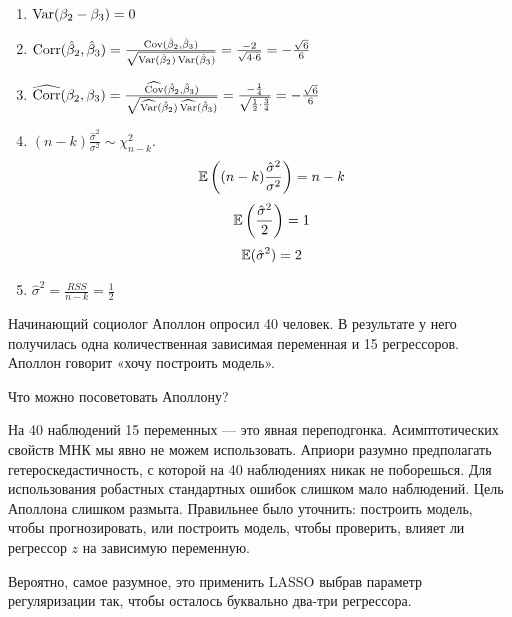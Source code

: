 \begin{problem}
\begin{sol}
\begin{enumerate}
\item $\operatorname{Var}(\beta_2-\beta_3)=0$

\item $\operatorname{Corr}(\hat{\beta}_2,\hat{\beta}_3)=\frac{\operatorname{Cov}(\hat{\beta}_2,\hat{\beta}_3)}{\sqrt{\operatorname{Var}(\hat{\beta}_2)\operatorname{Var}(\hat{\beta}_3)}}=\frac{-2}{\sqrt{4\cdot6}}=-\frac{\sqrt6}{6}$

\item $\operatorname{\widehat{\operatorname{Corr}}}(\beta_2,\beta_3)=\frac{\operatorname{\widehat{\operatorname{Cov}}}(\hat{\beta}_2,\hat{\beta}_3)}{\sqrt{\operatorname{\widehat{\operatorname{Var}}}(\hat{\beta}_2)\operatorname{\widehat{\operatorname{Var}}}(\hat{\beta}_3)}}=\frac{-\frac14}{\sqrt{\frac12\cdot\frac34}}=-\frac{\sqrt6}{6}$

\item $(n-k)\frac{\hat\sigma^2}{\sigma^2}\sim\chi^2_{n-k}$.
\[
\operatorname{\mathbb E}\left((n-k)\frac{\hat\sigma^2}{\sigma^2}\right)=n-k
\]
\[
\operatorname{\mathbb E}\left(\frac{\hat\sigma^2}{2}\right)=1
\]
\[
\operatorname{\mathbb E}(\hat\sigma^2)=2
\]

\item $\hat\sigma^2=\frac{RSS}{n-k}=\frac{1}{2}$

\end{enumerate}

\end{sol}
\end{problem}




\begin{problem}
Начинающий социолог Аполлон опросил 40 человек. 
В результате у него получилась одна количественная зависимая переменная и 15 регрессоров.
Аполлон говорит «хочу построить модель». 

Что можно посоветовать Аполлону?
\begin{sol}
На 40 наблюдений 15 переменных — это явная переподгонка. Асимптотических свойств МНК 
мы явно не можем использовать. Априори разумно предполагать гетероскедастичность, 
с которой на 40 наблюдениях никак не поборешься. Для использования робастных стандартных ошибок
слишком мало наблюдений. Цель Аполлона слишком размыта. Правильнее было уточнить:
построить модель, чтобы прогнозировать, или построить модель, чтобы проверить,
влияет ли регрессор $z$ на зависимую переменную. 

Вероятно, самое разумное, это применить LASSO выбрав параметр регуляризации так, 
чтобы осталось буквально два-три регрессора. 
\end{sol}
\end{problem}
  

